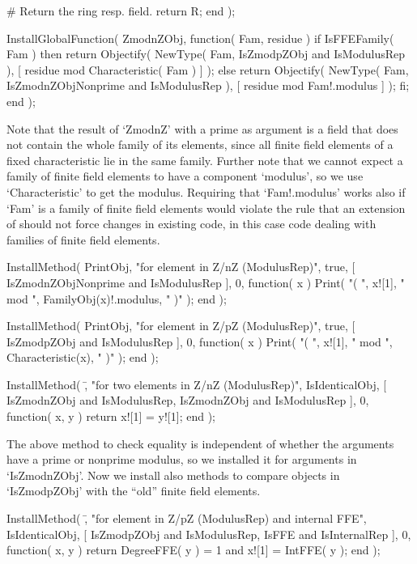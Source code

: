         # Return the ring resp. field.
        return R;
    end );


    InstallGlobalFunction( ZmodnZObj, function( Fam, residue )
    if IsFFEFamily( Fam ) then
      return Objectify( NewType( Fam,     IsZmodpZObj
                                      and IsModulusRep ),
                        [ residue mod Characteristic( Fam ) ] );
    else
      return Objectify( NewType( Fam,     IsZmodnZObjNonprime
                                      and IsModulusRep ),
                        [ residue mod Fam!.modulus ] );
    fi;
    end );
\endtt

Note that the result of `ZmodnZ' with a prime as argument is a field that
does not contain the whole family of its elements, since all finite field
elements of a fixed characteristic lie in the same family.
Further note that we cannot expect a family of finite field elements
to have a component `modulus',
so we use `Characteristic' to get the modulus.
Requiring that `Fam!.modulus' works also if `Fam' is a family of
finite field elements would violate the rule
that an extension of {\GAP} should not force changes in existing code,
in this case code dealing with families of finite field elements.

\begintt
    InstallMethod( PrintObj,
        "for element in Z/nZ (ModulusRep)",
        true,
        [ IsZmodnZObjNonprime and IsModulusRep ], 0,
        function( x )
        Print( "( ", x![1], " mod ", FamilyObj(x)!.modulus, " )" );
        end );

    InstallMethod( PrintObj,
        "for element in Z/pZ (ModulusRep)",
        true,
        [ IsZmodpZObj and IsModulusRep ], 0,
        function( x )
        Print( "( ", x![1], " mod ", Characteristic(x), " )" );
        end );

    InstallMethod( \=,
        "for two elements in Z/nZ (ModulusRep)",
        IsIdenticalObj,
        [ IsZmodnZObj and IsModulusRep,
          IsZmodnZObj and IsModulusRep ], 0,
        function( x, y ) return x![1] = y![1]; end );
\endtt

The above method to check equality is independent of whether the
arguments have a prime or nonprime modulus,
so we installed it for arguments in `IsZmodnZObj'.
Now we install also methods to compare objects in `IsZmodpZObj'
with the ``old'' finite field elements.

\begintt
    InstallMethod( \=,
        "for element in Z/pZ (ModulusRep) and internal FFE",
        IsIdenticalObj,
        [ IsZmodpZObj and IsModulusRep, IsFFE and IsInternalRep ], 0,
        function( x, y )
        return DegreeFFE( y ) = 1 and x![1] = IntFFE( y );
        end );

